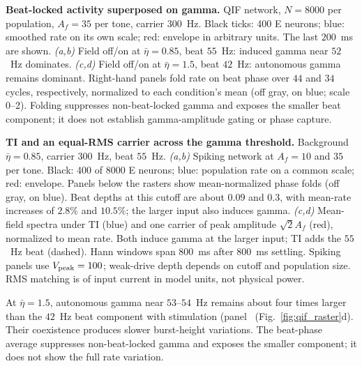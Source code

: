 \documentclass[11pt,a4paper]{article}
\providecommand{\DIFaddtex}[1]{{\protect\color{blue} \sf #1}} %
\providecommand{\DIFdeltex}[1]{{\protect\color{red} \scriptsize #1}} %
\providecommand{\DIFaddbegin}{} %
\providecommand{\DIFaddend}{} %
\providecommand{\DIFdelbegin}{} %
\providecommand{\DIFdelend}{} %
\providecommand{\DIFdelFL}[1]{\DIFdel{#1}} %
\providecommand{\DIFadd}[1]{\texorpdfstring{\DIFaddtex{#1}}{#1}} %
\providecommand{\DIFdel}[1]{\texorpdfstring{\DIFdeltex{#1}}{}} %
\begin{document}
\DIFdelbegin %
{%
\DIFdelFL{\textbf{Beat-locked activity superposed on gamma.}
QIF network, $N=8000$ per population, $A_f=35$ per tone, carrier $300$~Hz.
Black ticks: 400 E neurons; blue: smoothed rate on its own scale; red:
envelope in arbitrary units. The last $200$~ms are shown.
\emph{(a,b)} Field off/on at $\bar\eta=0.85$, beat $55$~Hz: induced gamma
near $52$~Hz dominates. \emph{(c,d)} Field off/on at $\bar\eta=1.5$,
beat $42$~Hz: autonomous gamma remains dominant.
Right-hand panels fold rate on beat phase over $44$ and $34$ cycles, respectively,
normalized to each condition's mean (off gray, on blue; scale 0--2).
Folding suppresses non-beat-locked gamma and exposes the smaller beat component;
it does not establish gamma-amplitude gating or phase capture.}}

{%
\DIFdelFL{\textbf{TI and an equal-RMS carrier across the gamma threshold.}
Background $\bar\eta=0.85$, carrier $300$~Hz, beat $55$~Hz.
\emph{(a,b)} Spiking network at $A_f=10$ and $35$ per tone.
Black: 400 of 8000 E neurons; blue: population rate on a common scale;
red: envelope. Panels below the rasters show mean-normalized phase folds
(off gray, on blue).
Beat depths at this cutoff are about $0.09$ and $0.3$, with mean-rate increases of $2.8\%$
and $10.5\%$; the larger input also induces gamma.
\emph{(c,d)} Mean-field spectra under TI (blue) and one carrier of peak
amplitude $\sqrt2 A_f$ (red), normalized to mean rate. Both induce gamma
at the larger input; TI adds the $55$~Hz beat (dashed).
Hann windows span $800$~ms after $800$~ms settling.
Spiking panels use $V_{\rm peak}=100$; weak-drive depth depends on cutoff and population size.
RMS matching is of input current in model units, not physical power.}}

\DIFdelend At $\bar\eta=1.5$, autonomous gamma near $53$--$54$~Hz remains about
four times larger than the $42$~Hz beat component \DIFdelbegin \DIFdel{with stimulation
(panel~}\DIFdelend \DIFaddbegin \DIFadd{(Fig.~\ref{fig:qif_raster}}\DIFaddend d).
Their coexistence produces slower burst-height variations. \DIFdelbegin \DIFdel{The beat-phase average suppresses non-beat-locked gamma and exposes
the smaller component; it does not show the full rate variation.
}%
\end{document}
